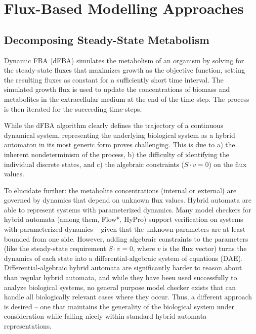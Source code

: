 \section{Flux-Based Modelling Approaches}

\subsection{Decomposing Steady-State Metabolism}


Dynamic FBA (dFBA) simulates the metabolism of an organism by solving for the steady-state fluxes that maximizes growth as the objective function, setting the resulting fluxes as constant for a sufficiently short time interval. The simulated growth flux is used to update the concentrations of biomass and metabolites in the extracellular medium at the end of the time step. The process is then iterated for the succeeding time-steps.


While the dFBA algorithm clearly defines the trajectory of a continuous dynamical system, representing the underlying biological system as a hybrid automaton in its most generic form proves challenging. This is due to a) the inherent nondeterminism of the process, b) the difficulty of identifying the individual discrete states, and c) the algebraic constraints ($S \cdot v = 0$) on the flux values.

To elucidate further: the metabolite concentrations (internal or external) are governed by dynamics that depend on unknown flux values. Hybrid automata are able to represent systems with parameterized dynamics. Many model checkers for hybrid automata (among them, Flow*, HyPro) support verification on systems with parameterized dynamics -- given that the unknown parameters are at least bounded from one side. However, adding algebraic constraints to the parameters (like the steady-state requirement $S \cdot v = 0$, where $v$ is the flux vector) turns the dynamics of each state into a differential-algebraic system of equations (DAE). Differential-algebraic hybrid automata are significantly harder to reason about than regular hybrid automata, and while they have been used successfully to analyze biological systems, no general purpose model checker exists that can handle all biologically relevant cases where they occur. Thus, a different approach is desired -- one that maintains the generality of the biological system under consideration while falling nicely within standard hybrid automata representations.


